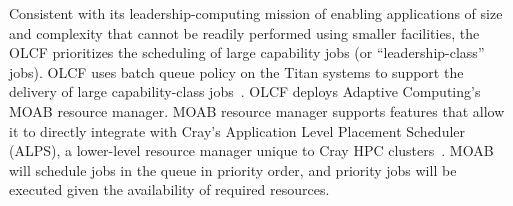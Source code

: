 
%
%



Consistent with its leadership-computing mission of enabling applications of
size and complexity that cannot be readily performed using smaller facilities,
the OLCF prioritizes the scheduling of large capability jobs (or
``leadership-class'' jobs). OLCF uses batch queue policy on the Titan systems
to support the delivery of large capability-class jobs~\cite{titan_sched}.  
OLCF deploys Adaptive Computing's MOAB resource manager. 
MOAB resource manager supports features that allow it to directly integrate with
Cray's Application Level Placement Scheduler (ALPS), a lower-level resource
manager unique to Cray HPC clusters~\cite{osti_1086656}. 
MOAB will schedule jobs in the queue in priority order, and priority jobs will
be executed given the availability of required resources.  


